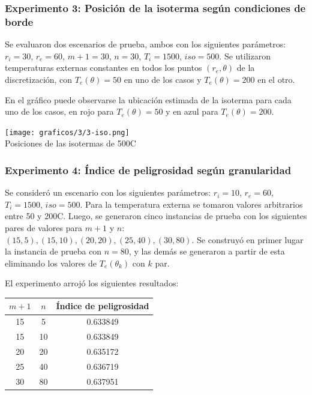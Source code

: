   \subsubsection*{Experimento 3: Posición de la isoterma según condiciones de borde}

    Se evaluaron dos escenarios de prueba, ambos con los siguientes parámetros: $r_i = 30$, $r_e = 60$, $m+1 = 30$, $n = 30$, $T_i = 1500$, $iso = 500$. Se utilizaron temperaturas externas constantes en todos los puntos $(r_e, \theta)$ de la discretización, con $T_e(\theta) = 50$ en uno de los casos y $T_e(\theta) = 200$ en el otro.

    En el gráfico puede observarse la ubicación estimada de la isoterma para cada uno de los casos, en rojo para $T_e(\theta) = 50$ y en azul para $T_e(\theta) = 200$.

    \begin{center}
      \texttt{[image: graficos/3/3-iso.png]} \\
      {\small Posiciones de las isotermas de 500{\degree}C}
    \end{center}

  \subsubsection*{Experimento 4: Índice de peligrosidad según granularidad}

    Se consideró un escenario con los siguientes parámetros: $r_i = 10$, $r_e = 60$, $T_i = 1500$, $iso = 500$. Para la temperatura externa se tomaron valores arbitrarios entre 50 y 200{\degree}C. Luego, se generaron cinco instancias de prueba con los siguientes pares de valores para $m + 1$ y $n$: $(15, 5), (15, 10), (20, 20), (25, 40), (30, 80)$. Se construyó en primer lugar la instancia de prueba con $n = 80$, y las demás se generaron a partir de esta eliminando los valores de $T_e(\theta_k)$ con $k$ par.

    El experimento arrojó los siguientes resultados:

    \begin{center}
      \begin{tabular}{c|c|c}
        $m+1$ & $n$ & Índice de peligrosidad \\ \hline
         15 & 5 & 0.633849 \\
        15 & 10 & 0.633849 \\
        20 & 20 & 0.635172 \\
        25 & 40 & 0.636719 \\
        30 & 80 & 0.637951
      \end{tabular}
    \end{center}

